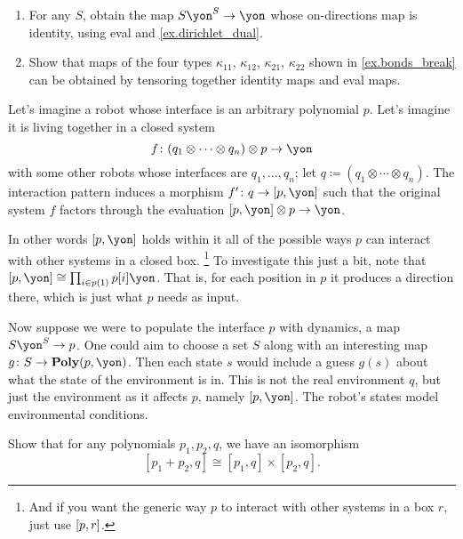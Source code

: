 \documentclass[Book-Poly]{subfiles}
\begin{document}
\begin{exercise}
\begin{enumerate}
	\item For any $S$, obtain the map $S\yon^S\to\yon$ whose on-directions map is identity, using eval and \cref{ex.dirichlet_dual}.
	\item Show that maps of the four types $\kappa_{11}$, $\kappa_{12}$, $\kappa_{21}$, $\kappa_{22}$ shown in \cref{ex.bonds_break} can be obtained by tensoring together identity maps and eval maps.
\qedhere
\end{enumerate}
\end{exercise}

\begin{example}
Let's imagine a robot whose interface is an arbitrary polynomial $p$. Let's imagine it is living together in a closed system
\[
	f\colon (q_1\otimes\cdots\otimes q_n)\otimes p\to \yon
\]
with some other robots whose interfaces are $q_1,\ldots,q_n$; let $q\coloneqq(q_1\otimes\cdots\otimes q_n)$. The interaction pattern induces a morphism $f'\colon q\to \ihom{p,\yon}$ such that the original system $f$ factors through the evaluation $\ihom{p,\yon}\otimes p\to \yon$.

In other words $\ihom{p,\yon}$ holds within it all of the possible ways $p$ can interact with other systems in a closed box.%
\footnote{And if you want the generic way $p$ to interact with other systems in a box $r$, just use $[p,r]$.}
To investigate this just a bit, note that $\ihom{p,\yon}\cong\prod_{i\in p(\1)}p[i]\yon$. That is, for each position in $p$ it produces a direction there, which is just what $p$ needs as input.

Now suppose we were to populate the interface $p$ with dynamics, a map $S\yon^S\to p$. One could aim to choose a set $S$ along with an interesting map $g\colon S\to\poly(p,\yon)$. Then each state $s$ would include a guess $g(s)$ about what the state of the environment is in. This is not the real environment $q$, but just the environment as it affects $p$, namely $\ihom{p,\yon}$. The robot's states model environmental conditions.
\end{example}


\begin{exercise}\label{exc.sum_times_closure}
Show that for any polynomials $p_1,p_2,q$, we have an isomorphism
\[
[p_1+p_2,q]\cong[p_1,q]\times[p_2,q].
\]
\end{exercise}
\end{document}

